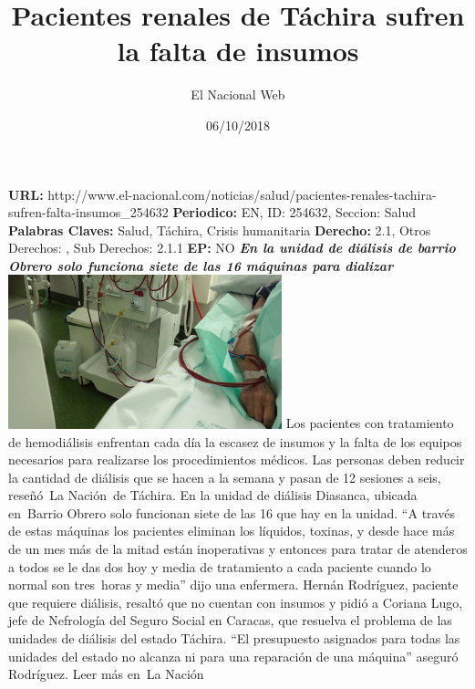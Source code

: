 \documentclass{article}%
\title{\textbf{Pacientes renales de Táchira sufren la falta de insumos}}%
\author{El Nacional Web}%
\date{06/10/2018}%
\begin{document}
%
\normalsize%
\maketitle%
\textbf{URL: }%
http://www.el{-}nacional.com/noticias/salud/pacientes{-}renales{-}tachira{-}sufren{-}falta{-}insumos\_254632\newline%
%
\textbf{Periodico: }%
EN, %
ID: %
254632, %
Seccion: %
Salud\newline%
%
\textbf{Palabras Claves: }%
Salud, Táchira, Crisis humanitaria\newline%
%
\textbf{Derecho: }%
2.1, %
Otros Derechos: %
, %
Sub Derechos: %
2.1.1\newline%
%
\textbf{EP: }%
NO\newline%
\newline%
%
\textbf{\textit{En la unidad de diálisis de barrio Obrero solo funciona siete de las 16 máquinas para dializar~}}%
\newline%
\newline%
%
\includegraphics[width=300px]{230.jpg}%
\newline%
%
Los pacientes con tratamiento de hemodiálisis enfrentan cada día la escasez de insumos y la falta de los equipos necesarios para realizarse los procedimientos médicos.%
\newline%
%
Las personas deben reducir la cantidad de diálisis que se hacen a la semana y pasan de 12 sesiones a seis, reseñó~La Nación~de Táchira.%
\newline%
%
En la unidad de diálisis Diasanca, ubicada en~Barrio Obrero solo funcionan siete de las 16 que hay en la unidad.%
\newline%
%
“A través de estas máquinas los pacientes eliminan los líquidos, toxinas, y desde hace más de un mes más de la mitad están inoperativas y entonces para tratar de atenderos a todos se le das dos hoy y media de tratamiento a cada paciente cuando lo normal son tres~horas y media” dijo una enfermera.%
\newline%
%
Hernán Rodríguez, paciente que requiere diálisis, resaltó que no cuentan con insumos y pidió a Coriana Lugo, jefe de Nefrología del Seguro Social en Caracas, que resuelva el problema de las unidades de diálisis del estado Táchira. “El presupuesto asignados para todas las unidades del estado no alcanza ni para una reparación de una máquina” aseguró Rodríguez.%
\newline%
%
Leer más en~La Nación%
\newline%
%
\end{document}
